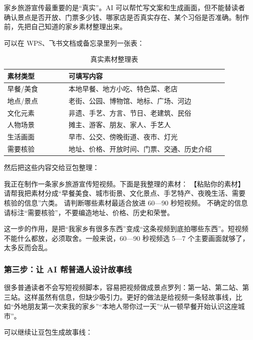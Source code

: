 家乡旅游宣传最重要的是“真实”。AI 可以帮忙写文案和生成画面，但不能替读者确认景点是否开放、门票多少钱、哪家店是否真实存在、某个习俗是否准确。制作前，先把自己知道的家乡素材整理出来。

可以在 WPS、飞书文档或备忘录里列一张表：

\begin{table}[H]
\centering
\caption{真实素材整理表}
\label{tab:real-material-sort}
\begin{tabular}{p{0.25\linewidth} p{0.65\linewidth}}
\toprule
\textbf{素材类型} & \textbf{可填写内容} \\
\midrule
早餐/美食 & 本地早餐、地方小吃、特色菜、老店 \\
地点/景点 & 老街、公园、博物馆、地标、广场、河边 \\
文化元素 & 非遗、手艺、方言、节日、老建筑、民俗 \\
人物场景 & 摊主、游客、朋友、家人、手艺人 \\
生活画面 & 早市、公交、傍晚街道、夜市、灯光 \\
需要核验 & 地址、价格、开放时间、门票、交通、历史介绍 \\
\bottomrule
\end{tabular}
\end{table}

然后把这些内容交给豆包整理：

\begin{tcolorbox}[promptbox]
我正在制作一条家乡旅游宣传短视频。下面是我整理的素材：
【粘贴你的素材】
请帮我把素材分成“早餐美食、城市街景、文化景点、手艺特产、夜晚生活、需要核验的信息”六类。
请判断哪些素材最适合放进 60—90 秒短视频。
不确定的信息请标注“需要核验”，不要编造地址、价格、历史和荣誉。
\end{tcolorbox}

这一步的作用，是把“我家乡有很多东西”变成“这条视频到底拍哪些东西”。短视频不能什么都放，必须取舍。一般来说，60—90 秒视频选 5—7 个主要画面就够了，太多反而会乱。

\subsubsection*{第三步：让 AI 帮普通人设计故事线}

很多普通读者不会写短视频脚本，容易把视频做成景点罗列：第一站、第二站、第三站。这样虽然有信息，但缺少吸引力。更好的做法是给视频一条轻故事线，比如“外地朋友第一次来我的家乡”“本地人带你过一天”“从一顿早餐开始认识这座城市”。

可以继续让豆包生成故事线：

